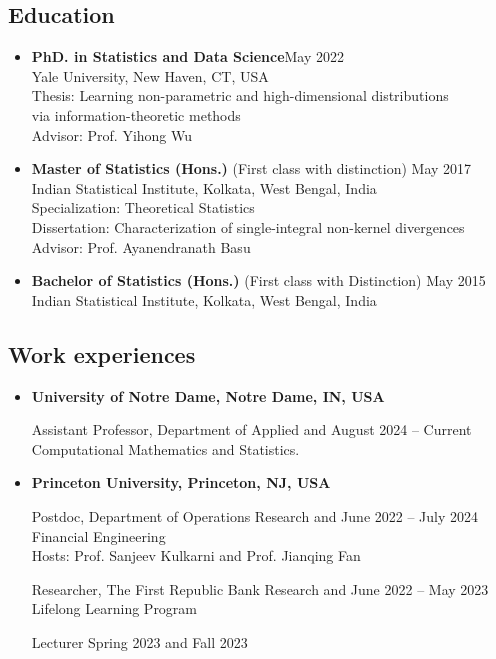 \documentclass[letterpaper,12pt,oneside]{article}
\theoremstyle{definition}
\begin{document}
			\subsection*{Education}
			
			\begin{itemize}
				\item[] {\bf PhD. in Statistics and Data Science}\hfill May 2022\\
				Yale University, New Haven, CT, USA\\
				Thesis: Learning non-parametric and high-dimensional distributions\\ 
				via information-theoretic
				methods \\
				Advisor: {Prof. Yihong Wu}  
				
				\item[] {\bf 	Master of Statistics (Hons.)} (First class with distinction) \hfill May 2017\\
				Indian Statistical Institute, Kolkata, West Bengal, India\\
				Specialization: Theoretical Statistics\\
				Dissertation: Characterization of single-integral non-kernel divergences \\
				Advisor: Prof. Ayanendranath Basu
				
				\item[] 
				{\bf Bachelor of Statistics (Hons.)} (First class with Distinction) \hfill May 2015 \\
				{Indian Statistical Institute, Kolkata, West Bengal, India}  
			\end{itemize}
			
			\subsection*{Work experiences}
			
			\begin{itemize}
				
				\item[] {\bf University of Notre Dame, Notre Dame, IN, USA}
				
				Assistant Professor, Department of Applied and \hfill August 2024 --  Current\\
				Computational Mathematics and Statistics.
				
				\item[] {\bf Princeton University, Princeton, NJ, USA}
				
				Postdoc,  Department of Operations Research and 
				\hfill June 2022 -- July 2024\\ Financial Engineering \\
				Hosts: Prof. Sanjeev Kulkarni and Prof. Jianqing Fan 
				
				Researcher, The First Republic Bank Research and  \hfill June 2022 -- May 2023\\
				Lifelong Learning Program
				
				Lecturer \hfill Spring 2023 and Fall 2023
				
			\end{itemize}
			
\end{document}
